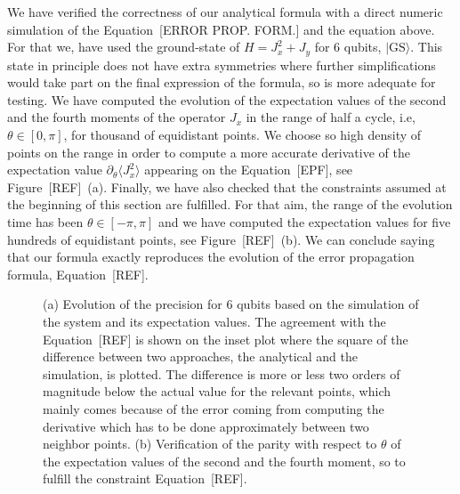 {We have verified the correctness of our analytical formula with a direct numeric simulation of the Equation~[ERROR PROP. FORM.] and the equation above.
For that we, have used the ground-state of $H=J_x^2+J_y$ for 6 qubits, $|\text{GS}\rangle$.
This state in principle does not have extra symmetries where further simplifications would take part on the final expression of the formula, so is more adequate for testing.
We have computed the evolution of the expectation values of the second and the fourth moments of the operator $J_x$ in the range of half a cycle, i.e, $\theta \in [0,\pi]$, for thousand of equidistant points.
We choose so high density of points on the range in order to compute a more accurate derivative of the expectation value $\partial_{\theta} \langle J_x^2\rangle$ appearing on the Equation~[EPF], see Figure~[REF]~(a).
Finally, we have also checked that the constraints assumed at the beginning of this section are fulfilled.
For that aim, the range of the evolution time has been $\theta \in [-\pi,\pi]$ and we have computed the expectation values for five hundreds of equidistant points, see Figure~[REF]~(b).
We can conclude saying that our formula exactly reproduces the evolution of the error propagation formula, Equation~[REF].
\begin{figure}[htp]
  \centering
  \caption[(a) Evolution of $\theta$. (b) Evolution of expectation values]{(a) Evolution of the precision for 6 qubits based on the simulation of the system and its expectation values.
  The agreement with the Equation~[REF] is shown on the inset plot where the square of the difference between two approaches, the analytical and the simulation, is plotted.
  The difference is more or less two orders of magnitude below the actual value for the relevant points, which mainly comes because of the error coming from computing the derivative which has to be done approximately between two neighbor points.
  (b) Verification of the parity with respect to $\theta$ of the expectation values of the second and the fourth moment, so to fulfill the constraint Equation~[REF].}
  \label{fig:bg-histograms}
\end{figure}


}
